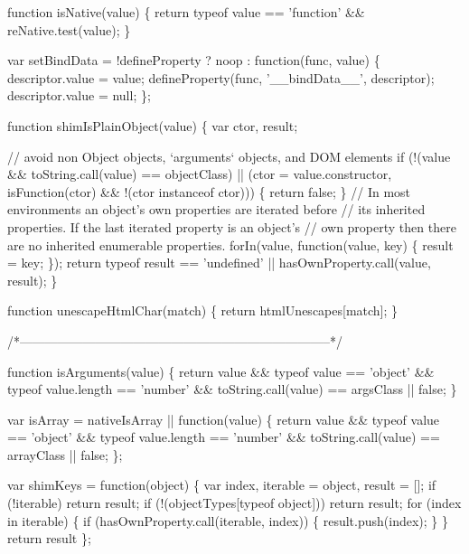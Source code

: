 \begin{DoxyCodeInclude}
    \textcolor{keyword}{function} isNative(value) \{
      \textcolor{keywordflow}{return} typeof value == \textcolor{stringliteral}{'function'} && reNative.test(value);
    \}

    var setBindData = !defineProperty ? noop : \textcolor{keyword}{function}(func, value) \{
      descriptor.value = value;
      defineProperty(func, \textcolor{stringliteral}{'\_\_bindData\_\_'}, descriptor);
      descriptor.value = null;
    \};

    \textcolor{keyword}{function} shimIsPlainObject(value) \{
      var ctor,
          result;

      \textcolor{comment}{// avoid non Object objects, `arguments` objects, and DOM elements}
      \textcolor{keywordflow}{if} (!(value && toString.call(value) == objectClass) ||
          (ctor = value.constructor, isFunction(ctor) && !(ctor instanceof ctor))) \{
        \textcolor{keywordflow}{return} \textcolor{keyword}{false};
      \}
      \textcolor{comment}{// In most environments an object's own properties are iterated before}
      \textcolor{comment}{// its inherited properties. If the last iterated property is an object's}
      \textcolor{comment}{// own property then there are no inherited enumerable properties.}
      forIn(value, \textcolor{keyword}{function}(value, key) \{
        result = key;
      \});
      \textcolor{keywordflow}{return} typeof result == \textcolor{stringliteral}{'undefined'} || hasOwnProperty.call(value, result);
    \}

    \textcolor{keyword}{function} unescapeHtmlChar(match) \{
      \textcolor{keywordflow}{return} htmlUnescapes[match];
    \}

    \textcolor{comment}{/*--------------------------------------------------------------------------*/}

    \textcolor{keyword}{function} isArguments(value) \{
      \textcolor{keywordflow}{return} value && typeof value == \textcolor{stringliteral}{'object'} && typeof value.length == \textcolor{stringliteral}{'number'} &&
        toString.call(value) == argsClass || \textcolor{keyword}{false};
    \}

    var isArray = nativeIsArray || \textcolor{keyword}{function}(value) \{
      \textcolor{keywordflow}{return} value && typeof value == \textcolor{stringliteral}{'object'} && typeof value.length == \textcolor{stringliteral}{'number'} &&
        toString.call(value) == arrayClass || \textcolor{keyword}{false};
    \};

    var shimKeys = \textcolor{keyword}{function}(object) \{
      var index, iterable = object, result = [];
      \textcolor{keywordflow}{if} (!iterable) \textcolor{keywordflow}{return} result;
      \textcolor{keywordflow}{if} (!(objectTypes[typeof \textcolor{keywordtype}{object}])) \textcolor{keywordflow}{return} result;
        \textcolor{keywordflow}{for} (index in iterable) \{
          \textcolor{keywordflow}{if} (hasOwnProperty.call(iterable, index)) \{
            result.push(index);
          \}
        \}
      \textcolor{keywordflow}{return} result
    \};


\end{DoxyCodeInclude}
